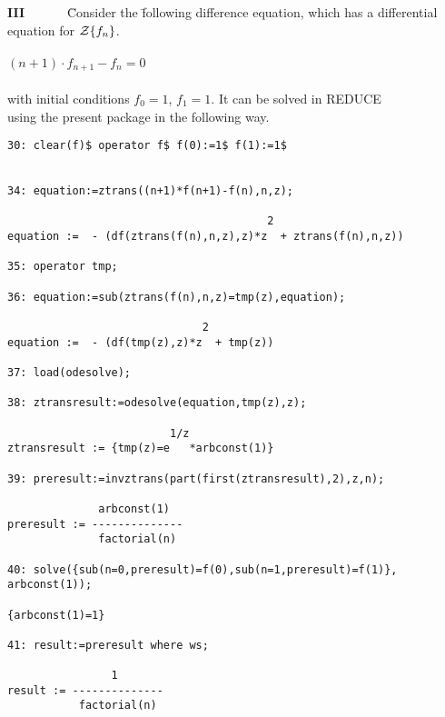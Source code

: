 \begin{tabbing}
\\ \\
{\bf III} \ \ \ \ \ \ \= 

    Consider the \=following difference equation, which has a
    differential\\
 \> equation for ${\cal Z}\{f_n\}$.\\ \\

 \>\> $(n+1) \cdot f_{n+1}-f_n=0$\\ \\

 \> with initial conditions $f_0=1$, $f_1=1$. It can be solved in REDUCE\\
 \>  using the present package in the following way.\\

\end{tabbing}
\begin{verbatim}
30: clear(f)$ operator f$ f(0):=1$ f(1):=1$


34: equation:=ztrans((n+1)*f(n+1)-f(n),n,z);

                                        2
equation :=  - (df(ztrans(f(n),n,z),z)*z  + ztrans(f(n),n,z))

35: operator tmp;

36: equation:=sub(ztrans(f(n),n,z)=tmp(z),equation);

                              2
equation :=  - (df(tmp(z),z)*z  + tmp(z))

37: load(odesolve);

38: ztransresult:=odesolve(equation,tmp(z),z);

                         1/z
ztransresult := {tmp(z)=e   *arbconst(1)}

39: preresult:=invztrans(part(first(ztransresult),2),z,n);

              arbconst(1)
preresult := --------------
              factorial(n)

40: solve({sub(n=0,preresult)=f(0),sub(n=1,preresult)=f(1)},
arbconst(1));

{arbconst(1)=1}

41: result:=preresult where ws;

                1
result := --------------
           factorial(n)

\end{verbatim}
